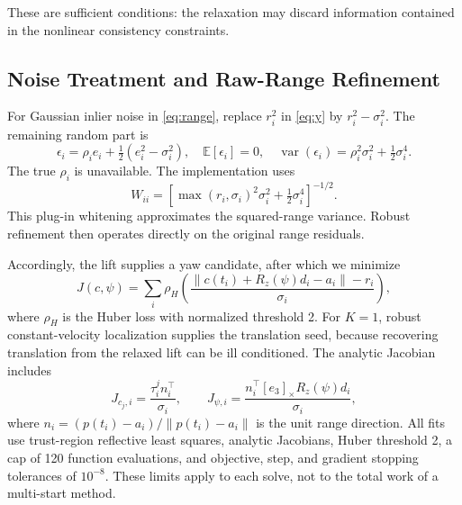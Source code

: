 \documentclass[conference,letterpaper,10pt]{IEEEtran}
\newcommand{\sk}[1]{[#1]_{\times}}
\newcommand{\norm}[1]{\left\lVert#1\right\rVert}
\newcommand{\rz}{R_z}
\begin{document}
These are sufficient conditions: the relaxation may discard information contained in the nonlinear consistency constraints.

\subsection{Noise Treatment and Raw-Range Refinement}
For Gaussian inlier noise in \eqref{eq:range}, replace $r_i^2$ in \eqref{eq:y} by $r_i^2-\sigma_i^2$. The remaining random part is
\begin{equation}
 \epsilon_i=\rho_i e_i+\tfrac12(e_i^2-\sigma_i^2),\quad
 \mathbb E[\epsilon_i]=0,\quad
 \operatorname{var}(\epsilon_i)=\rho_i^2\sigma_i^2+\tfrac12\sigma_i^4.
 \label{eq:squarednoise}
\end{equation}
The true $\rho_i$ is unavailable. The implementation uses
\begin{equation}
 W_{ii}=\left[\max(r_i,\sigma_i)^2\sigma_i^2+\tfrac12\sigma_i^4\right]^{-1/2}.
\end{equation}
This plug-in whitening approximates the squared-range variance. Robust refinement then operates directly on the original range residuals.

Accordingly, the lift supplies a yaw candidate, after which we minimize
\begin{equation}
 J(c,\psi)=\sum_i\rho_H\!\left(
 \frac{\norm{c(t_i)+\rz(\psi)d_i-a_i}-r_i}{\sigma_i}\right),
 \label{eq:rawcost}
\end{equation}
where $\rho_H$ is the Huber loss with normalized threshold 2. For $K=1$, robust constant-velocity localization supplies the translation seed, because recovering translation from the relaxed lift can be ill conditioned. The analytic Jacobian includes
\begin{equation}
 J_{c_j,i}=\frac{\tau_i^j n_i^\top}{\sigma_i},\qquad
 J_{\psi,i}=\frac{n_i^\top\sk{e_3}\rz(\psi)d_i}{\sigma_i},
 \label{eq:jacobian}
\end{equation}
where $n_i=(p(t_i)-a_i)/\norm{p(t_i)-a_i}$ is the unit range direction. All fits use trust-region reflective least squares, analytic Jacobians, Huber threshold 2, a cap of 120 function evaluations, and objective, step, and gradient stopping tolerances of $10^{-8}$. These limits apply to each solve, not to the total work of a multi-start method.
\end{document}
